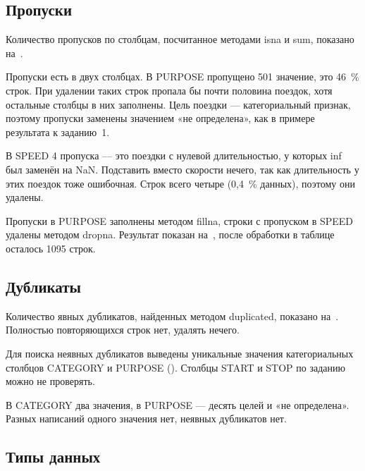 \documentclass[a4paper,14pt]{extarticle}
\begin{document}

\subsection{Пропуски}

Количество пропусков по столбцам, посчитанное методами isna и sum, показано на~.


Пропуски есть в двух столбцах. В PURPOSE пропущено 501 значение, это 46~\% строк. При удалении таких строк пропала бы почти половина поездок, хотя остальные столбцы в них заполнены. Цель поездки — категориальный признак, поэтому пропуски заменены значением «не определена», как в примере результата к заданию~1.

В SPEED 4 пропуска — это поездки с нулевой длительностью, у которых inf был заменён на NaN. Подставить вместо скорости нечего, так как длительность у этих поездок тоже ошибочная. Строк всего четыре (0,4~\% данных), поэтому они удалены.

Пропуски в PURPOSE заполнены методом fillna, строки с пропуском в SPEED удалены методом dropna. Результат показан на~, после обработки в таблице осталось 1095 строк.


\subsection{Дубликаты}

Количество явных дубликатов, найденных методом duplicated, показано на~. Полностью повторяющихся строк нет, удалять нечего.


Для поиска неявных дубликатов выведены уникальные значения категориальных столбцов CATEGORY и PURPOSE (). Столбцы START и STOP по заданию можно не проверять.


В CATEGORY два значения, в PURPOSE — десять целей и «не определена». Разных написаний одного значения нет, неявных дубликатов нет.

\subsection{Типы данных}
\end{document}

